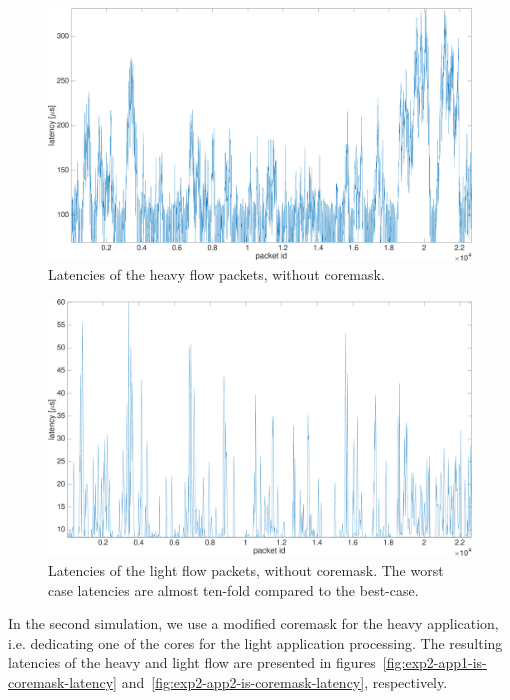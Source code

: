 \begin{figure}[]
  \begin{center}
    \includegraphics[width=\textwidth]{images/experiment/exp2-app1-no-coremask-latency.pdf}
    \caption{Latencies of the heavy flow packets, without coremask.}
    \label{fig:exp2-app1-no-coremask-latency}
  \end{center}
\end{figure}

\begin{figure}[]
  \begin{center}
    \includegraphics[width=\textwidth]{images/experiment/exp2-app2-no-coremask-latency.pdf}
    \caption{Latencies of the light flow packets, without coremask. The worst case latencies are almost ten-fold compared to the best-case.}
    \label{fig:exp2-app2-no-coremask-latency}
  \end{center}
\end{figure}

In the second simulation, we use a modified coremask for the heavy application, i.e. dedicating one of the cores for the light application processing. The resulting latencies of the heavy and light flow are presented in figures~\ref{fig:exp2-app1-is-coremask-latency} and~\ref{fig:exp2-app2-is-coremask-latency}, respectively.

